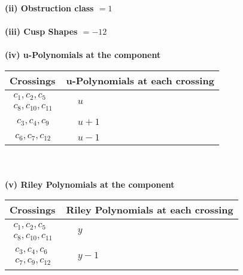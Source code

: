 \documentclass[1p]{elsarticle_modified}
\theoremstyle{definition}
\begin{document}
\flushleft \textbf{(ii) Obstruction class $= 1$}\\~\\
\flushleft \textbf{(iii) Cusp Shapes $= -12$}\\~\\
\newpage\renewcommand{\arraystretch}{1}
\flushleft \textbf{(iv) u-Polynomials at the component}\newline \\
\begin{tabular}{m{50pt}|m{274pt}}
Crossings & \hspace{64pt}u-Polynomials at each crossing \\
\hline $$\begin{aligned}c_{1},c_{2},c_{5}\\c_{8},c_{10},c_{11}\end{aligned}$$&$\begin{aligned}
&u
\end{aligned}$\\
\hline $$\begin{aligned}c_{3},c_{4},c_{9}\end{aligned}$$&$\begin{aligned}
&u+1
\end{aligned}$\\
\hline $$\begin{aligned}c_{6},c_{7},c_{12}\end{aligned}$$&$\begin{aligned}
&u-1
\end{aligned}$\\
\hline
\end{tabular}\\~\\
\newpage\renewcommand{\arraystretch}{1}
\flushleft \textbf{(v) Riley Polynomials at the component}\newline \\
\begin{tabular}{m{50pt}|m{274pt}}
Crossings & \hspace{64pt}Riley Polynomials at each crossing \\
\hline $$\begin{aligned}c_{1},c_{2},c_{5}\\c_{8},c_{10},c_{11}\end{aligned}$$&$\begin{aligned}
&y
\end{aligned}$\\
\hline $$\begin{aligned}c_{3},c_{4},c_{6}\\c_{7},c_{9},c_{12}\end{aligned}$$&$\begin{aligned}
&y-1
\end{aligned}$\\
\hline
\end{tabular}\\~\\
\end{document}
